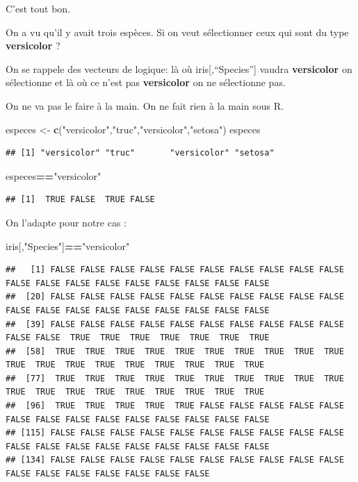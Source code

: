 \documentclass[
]{book}
\newenvironment{Shaded}{\begin{snugshade}}{\end{snugshade}}
\newcommand{\FunctionTok}[1]{\textcolor[rgb]{0.13,0.29,0.53}{\textbf{#1}}}
\newcommand{\NormalTok}[1]{#1}
\newcommand{\OtherTok}[1]{\textcolor[rgb]{0.56,0.35,0.01}{#1}}
\newcommand{\SpecialCharTok}[1]{\textcolor[rgb]{0.81,0.36,0.00}{\textbf{#1}}}
\newcommand{\StringTok}[1]{\textcolor[rgb]{0.31,0.60,0.02}{#1}}
\begin{document}
C'est tout bon.

On a vu qu'il y avait trois espèces. Si on veut sélectionner ceux qui sont du type
\textbf{versicolor} ?

On se rappele des vecteurs de logique: là où iris{[},``Species''{]} vaudra \textbf{versicolor}
on sélectionne et là où ce n'est pas \textbf{versicolor} on ne sélectionne pas.

On ne va pas le faire à la main. On ne fait rien à la main sous R.

\begin{Shaded}
\begin{Highlighting}[]
\NormalTok{especes }\OtherTok{\textless{}{-}} \FunctionTok{c}\NormalTok{(}\StringTok{"versicolor"}\NormalTok{,}\StringTok{"truc"}\NormalTok{,}\StringTok{"versicolor"}\NormalTok{,}\StringTok{"setosa"}\NormalTok{)}
\NormalTok{especes}
\end{Highlighting}
\end{Shaded}

\begin{verbatim}
## [1] "versicolor" "truc"       "versicolor" "setosa"
\end{verbatim}

\begin{Shaded}
\begin{Highlighting}[]
\NormalTok{especes}\SpecialCharTok{==}\StringTok{"versicolor"}
\end{Highlighting}
\end{Shaded}

\begin{verbatim}
## [1]  TRUE FALSE  TRUE FALSE
\end{verbatim}

On l'adapte pour notre cas :

\begin{Shaded}
\begin{Highlighting}[]
\NormalTok{iris[,}\StringTok{"Species"}\NormalTok{]}\SpecialCharTok{==}\StringTok{"versicolor"}
\end{Highlighting}
\end{Shaded}

\begin{verbatim}
##   [1] FALSE FALSE FALSE FALSE FALSE FALSE FALSE FALSE FALSE FALSE FALSE FALSE FALSE FALSE FALSE FALSE FALSE FALSE FALSE
##  [20] FALSE FALSE FALSE FALSE FALSE FALSE FALSE FALSE FALSE FALSE FALSE FALSE FALSE FALSE FALSE FALSE FALSE FALSE FALSE
##  [39] FALSE FALSE FALSE FALSE FALSE FALSE FALSE FALSE FALSE FALSE FALSE FALSE  TRUE  TRUE  TRUE  TRUE  TRUE  TRUE  TRUE
##  [58]  TRUE  TRUE  TRUE  TRUE  TRUE  TRUE  TRUE  TRUE  TRUE  TRUE  TRUE  TRUE  TRUE  TRUE  TRUE  TRUE  TRUE  TRUE  TRUE
##  [77]  TRUE  TRUE  TRUE  TRUE  TRUE  TRUE  TRUE  TRUE  TRUE  TRUE  TRUE  TRUE  TRUE  TRUE  TRUE  TRUE  TRUE  TRUE  TRUE
##  [96]  TRUE  TRUE  TRUE  TRUE  TRUE FALSE FALSE FALSE FALSE FALSE FALSE FALSE FALSE FALSE FALSE FALSE FALSE FALSE FALSE
## [115] FALSE FALSE FALSE FALSE FALSE FALSE FALSE FALSE FALSE FALSE FALSE FALSE FALSE FALSE FALSE FALSE FALSE FALSE FALSE
## [134] FALSE FALSE FALSE FALSE FALSE FALSE FALSE FALSE FALSE FALSE FALSE FALSE FALSE FALSE FALSE FALSE FALSE
\end{verbatim}
\end{document}
